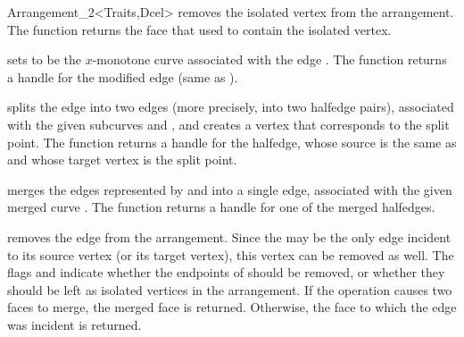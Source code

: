 \begin{ccRefClass}{Arrangement_2<Traits,Dcel>}
   {removes the isolated vertex  from the arrangement. The function
    returns the face  that used to contain the isolated vertex.
    }

   {sets  to be the $x$-monotone curve associated with the edge .
    The function returns a handle for the modified edge (same as ).
    }

  {splits the edge  into two edges (more precisely, into two halfedge
   pairs), associated with the given subcurves  and , and
   creates a vertex that corresponds to the split point. 
   The function returns a handle for the halfedge, whose source is the same
   as  and whose target vertex is the split point.
   }

  {merges the edges represented by  and  into
   a single edge, associated with the given merged curve . 
   The function returns a handle for one of the merged halfedges.
   }

  {removes the edge  from the arrangement. Since the  may
   be the only edge incident to its source vertex (or its target vertex),
   this vertex can be removed as well. The flags  and
    indicate whether the endpoints of  should be
   removed, or whether they should be left as isolated vertices in the
   arrangement.
   If the operation causes two faces to merge, the merged face is returned.
   Otherwise, the face to which the edge was incident is returned.}


\end{ccRefClass}
